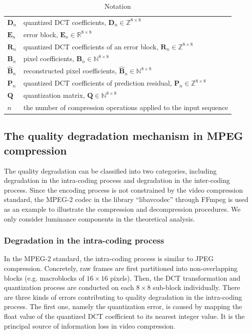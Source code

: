 \documentclass[journal,sort]{IEEEtran}
\begin{document}
\begin{table}
	\setlength{\abovecaptionskip}{0.cm}
	\setlength{\belowcaptionskip}{-0.cm}
	\small
	\centering
	\caption{\label{notation}Notation}
		\begin{tabular}{ l p{7.5cm} }
			$\mathbf{D}_n$ &quantized DCT coefficients, $\mathbf{D}_n\in \mathbb{Z}^{8\times8}$\\
			$\mathbf{E}_n$ &error block, $\mathbf{E}_n\in \mathbb{R}^{8\times8}$ \\
			$\mathbf{R}_n$ &quantized DCT coefficients of an error block, $\mathbf{R}_n\in \mathbb{Z}^{8\times8}$ \\
			$\mathbf{B}_n$ &pixel coefficients, $\mathbf{B}_n\in \mathbb{N}^{8\times8}$ \\
			$\mathbf{\hat{B}}_n$ &reconstructed pixel coefficients, $\mathbf{\hat{B}}_n\in \mathbb{N}^{8\times8}$ \\
			$\mathbf{P}_n$ &quantized DCT coefficients of prediction residual, $\mathbf{P}_n\in \mathbb{Z}^{8\times8}$ \\
			$\mathbf{Q}$ &quantization matrix, $\mathbf{Q}\in \mathbb{N}^{8\times8}$\\
			$n$ &the number of compression operations applied to the input sequence\\
		\end{tabular}
\end{table}

\subsection{The quality degradation mechanism in MPEG compression}
The quality degradation can be classified into two categories, including degradation in the intra-coding process and degradation in the inter-coding process. Since the encoding process is not constrained by the video compression standard, the MPEG-2 codec in the library ``libavcodec'' through FFmpeg\cite{FFmpeg} is used as an example to illustrate the compression and decompression procedures. We only consider luminance components in the theoretical analysis.

\subsubsection{Degradation in the intra-coding process \label{degrad-intra}}
In the MPEG-2 standard, the intra-coding process is similar to JPEG compression. Concretely, raw frames are first partitioned into non-overlapping blocks (e.g. macroblocks of $16\times16$ pixels). Then, the DCT transformation and quantization process are conducted on each $8\times8$ sub-block individually. There are three kinds of errors contributing to quality degradation in the intra-coding process. The first one, namely the quantization error, is caused by mapping the float value of the quantized DCT coefficient to its nearest integer value. It is the principal source of information loss in video compression. 
\end{document}
